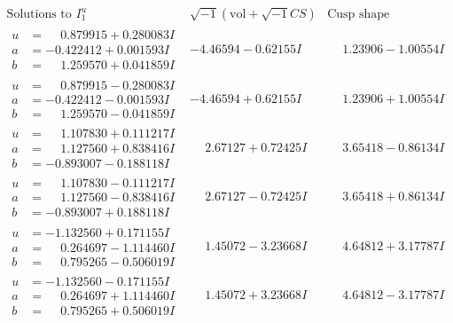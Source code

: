 \documentclass[1p]{elsarticle_modified}
\theoremstyle{definition}
\newcommand{\I}{\sqrt{-1}}
\begin{document}
$$\begin{array}{c|c|c}  
\text{Solutions to }I^u_{1}& \I (\text{vol} + \sqrt{-1}CS) & \text{Cusp shape}\\
 \hline 
\begin{aligned}
u &= \phantom{-}0.879915 + 0.280083 I \\
a &= -0.422412 + 0.001593 I \\
b &= \phantom{-}1.259570 + 0.041859 I\end{aligned}
 & -4.46594 - 0.62155 I & \phantom{-}1.23906 - 1.00554 I \\ \hline\begin{aligned}
u &= \phantom{-}0.879915 - 0.280083 I \\
a &= -0.422412 - 0.001593 I \\
b &= \phantom{-}1.259570 - 0.041859 I\end{aligned}
 & -4.46594 + 0.62155 I & \phantom{-}1.23906 + 1.00554 I \\ \hline\begin{aligned}
u &= \phantom{-}1.107830 + 0.111217 I \\
a &= \phantom{-}1.127560 + 0.838416 I \\
b &= -0.893007 - 0.188118 I\end{aligned}
 & \phantom{-}2.67127 + 0.72425 I & \phantom{-}3.65418 - 0.86134 I \\ \hline\begin{aligned}
u &= \phantom{-}1.107830 - 0.111217 I \\
a &= \phantom{-}1.127560 - 0.838416 I \\
b &= -0.893007 + 0.188118 I\end{aligned}
 & \phantom{-}2.67127 - 0.72425 I & \phantom{-}3.65418 + 0.86134 I \\ \hline\begin{aligned}
u &= -1.132560 + 0.171155 I \\
a &= \phantom{-}0.264697 - 1.114460 I \\
b &= \phantom{-}0.795265 - 0.506019 I\end{aligned}
 & \phantom{-}1.45072 - 3.23668 I & \phantom{-}4.64812 + 3.17787 I \\ \hline\begin{aligned}
u &= -1.132560 - 0.171155 I \\
a &= \phantom{-}0.264697 + 1.114460 I \\
b &= \phantom{-}0.795265 + 0.506019 I\end{aligned}
 & \phantom{-}1.45072 + 3.23668 I & \phantom{-}4.64812 - 3.17787 I \\ \hline\begin{aligned}

\end{aligned}
\end{array}$$
\end{document}

